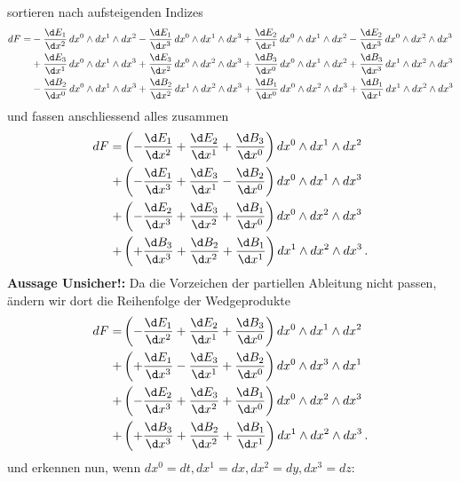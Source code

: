 sortieren nach aufsteigenden Indizes
 \begin{align*}
	dF =
	&- \frac{\d E_1}{\d x^2} \, dx^0 \wedge dx^1 \wedge dx^2 - \frac{\d E_1}{\d x^3} \, dx^0 \wedge dx^1 \wedge dx^3
	 + \frac{\d E_2}{\d x^1} \, dx^0 \wedge dx^1 \wedge dx^2 - \frac{\d E_2}{\d x^3} \, dx^0 \wedge dx^2 \wedge dx^3
	\\
	&+ \frac{\d E_3}{\d x^1} \, dx^0 \wedge dx^1 \wedge dx^3 + \frac{\d E_3}{\d x^2} \, dx^0 \wedge dx^2 \wedge dx^3
	 + \frac{\d B_3}{\d x^0} \, dx^0 \wedge dx^1 \wedge dx^2 + \frac{\d B_3}{\d x^3} \, dx^1 \wedge dx^2 \wedge dx^3
	\\
	&- \frac{\d B_2}{\d x^0} \, dx^0 \wedge dx^1 \wedge dx^3 + \frac{\d B_2}{\d x^2} \, dx^1 \wedge dx^2 \wedge dx^3
	 + \frac{\d B_1}{\d x^0} \, dx^0 \wedge dx^2 \wedge dx^3 + \frac{\d B_1}{\d x^1} \, dx^1 \wedge dx^2 \wedge dx^3
\end{align*}
und fassen anschliessend alles zusammen
\begin{align*}
	dF =
	&\left( - \frac{\d E_1}{\d x^2} + \frac{\d E_2}{\d x^1} + \frac{\d B_3}{\d x^0} \right) dx^0 \wedge dx^1 \wedge dx^2
	\\
	+&\left( - \frac{\d E_1}{\d x^3} + \frac{\d E_3}{\d x^1} - \frac{\d B_2}{\d x^0} \right) dx^0 \wedge dx^1 \wedge dx^3
	\\
	+&\left( - \frac{\d E_2}{\d x^3} + \frac{\d E_3}{\d x^2} + \frac{\d B_1}{\d x^0} \right) dx^0 \wedge dx^2 \wedge dx^3
	\\
	+&\left( + \frac{\d B_3}{\d x^3} + \frac{\d B_2}{\d x^2} + \frac{\d B_1}{\d x^1} \right) dx^1 \wedge dx^2 \wedge dx^3 \, .
\end{align*}
\textbf{Aussage Unsicher!:} Da die Vorzeichen der partiellen Ableitung nicht passen, ändern wir dort die Reihenfolge der Wedgeprodukte
\begin{align*}
	dF =
	&\left( - \frac{\d E_1}{\d x^2} + \frac{\d E_2}{\d x^1} + \frac{\d B_3}{\d x^0} \right) dx^0 \wedge dx^1 \wedge dx^2
	\\
	+&\left( + \frac{\d E_1}{\d x^3} - \frac{\d E_3}{\d x^1} + \frac{\d B_2}{\d x^0} \right) dx^0 \wedge dx^3 \wedge dx^1
	\\
	+&\left( - \frac{\d E_2}{\d x^3} + \frac{\d E_3}{\d x^2} + \frac{\d B_1}{\d x^0} \right) dx^0 \wedge dx^2 \wedge dx^3
	\\
	+&\left( + \frac{\d B_3}{\d x^3} + \frac{\d B_2}{\d x^2} + \frac{\d B_1}{\d x^1} \right) dx^1 \wedge dx^2 \wedge dx^3 \, .
\end{align*}
und erkennen nun, wenn $dx^0 = dt, dx^1 = dx, dx^2 = dy, dx^3 = dz$:
